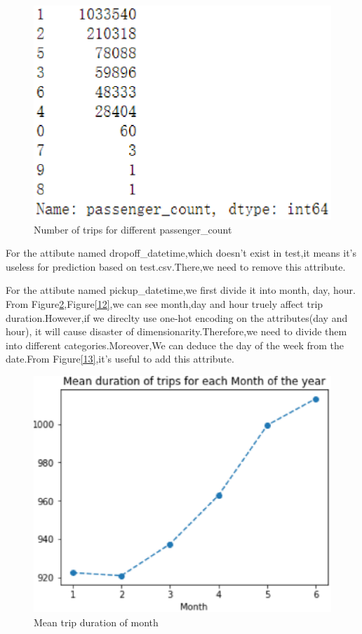 \begin{figure}[htbp]
	\centering
	\includegraphics[scale=0.4]{figures/seven.eps}
	\caption{Number of trips for different passenger\_count} \label{seven}
\end{figure}

\par For the attibute named dropoff\_datetime,which doesn't exist in test,it means it's useless for prediction based on test.csv.There,we need to remove this attribute.

\par For the attibute named pickup\_datetime,we first divide it into  month, day, hour. From Figure\ref{nine},Figure\ref{12},we can see month,day and hour truely affect trip duration.However,if we direclty use one-hot encoding on the attributes(day and hour), it will cause disaster of dimensionarity.Therefore,we need to divide them into different categories.Moreover,We can deduce the day of the week from the date.From Figure\ref{13},it's useful to add this attribute.  

\begin{figure}[htbp]
	\centering
	\includegraphics[scale=0.4]{figures/nine.eps}
	\caption{Mean trip duration of month } \label{nine}
\end{figure}

